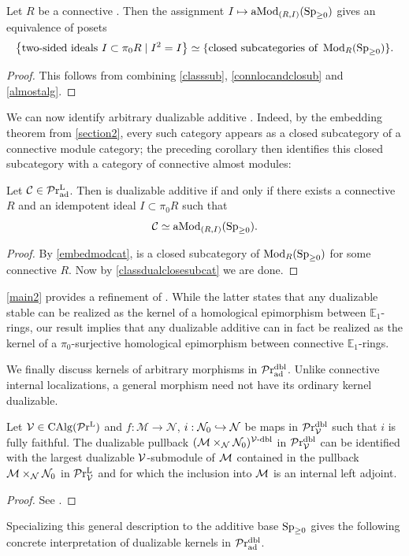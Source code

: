 \documentclass[a4paper,10pt, oneside]{amsart}
\begin{document}
	
	\begin{cor}\label{classdualclosesubcat}
		Let $R$ be a connective \eonering. Then the assignment $I\mapsto \operatorname{aMod}_{(R,I)}(\operatorname{Sp}_{\geq0})$ gives an equivalence of posets
		$$\left\{\text{two-sided ideals } I \subset \pi_0 R \mid I^2=I\right\} \simeq \{\text{closed subcategories of }\operatorname{Mod}_R(\operatorname{Sp}_{\geq0})\} .$$
	\end{cor}
	\begin{proof}

		This follows from combining \cref{classsub}, \cref{connlocandclosub} and \cref{almostalg}.

	\end{proof}
	We can now identify arbitrary dualizable additive \infcats. Indeed, by the embedding theorem from \cref{section2}, every such category appears as a closed subcategory of a connective module category; the preceding corollary then identifies this closed subcategory with a category of connective almost modules:
	
		\begin{thm}\label{main2}
		Let $\mathcal{C}\in \mathcal{P}\mathrm{r}_{\mathrm{ad}}^\mathrm{L}$. Then \mcc is dualizable additive if and only if there exists a connective \eonering $R$ and an idempotent ideal $I\subset \pi_0R$ such that $$\mathcal{C}\simeq \operatorname{aMod}_{(R,I)}(\operatorname{Sp}_{\geq0}).$$
	\end{thm}
	\begin{proof}
		By \cref{embedmodcat}, \mcc is a closed subcategory of  $\operatorname{Mod}_R(\operatorname{Sp}_{\geq0})$ for some connective \eonering $R$. Now by  \cref{classdualclosesubcat} we are done.
	\end{proof}
	
\begin{rem}
	\cref{main2} provides a refinement of \cite[Theorem 2.10.16]{krause2024sheaves}. While the latter states that any dualizable stable \infcat can be realized as the kernel of a homological epimorphism between $\mathbb{E}_1$-rings, our result implies that any dualizable additive \infcat can in fact be realized as the kernel of a $\pi_0$-surjective homological epimorphism between connective $\mathbb{E}_1$-rings.
\end{rem}
We finally discuss kernels of arbitrary morphisms in $\mathcal{P}\mathrm{r}_{\mathrm{ad}}^{\mathrm{dbl}}$. Unlike connective internal localizations, a general morphism need not have its ordinary kernel dualizable.

	\begin{lem}\label{dualker1}
		Let $\mathcal{V}\in\operatorname{CAlg}(\mathcal{P}\mathrm{r}^\mathrm{L})$ and $f: \mathcal{M} \rightarrow \mathcal{N}$, $i:\mathcal{N}_0\hookrightarrow\mathcal{N}$ be maps in $\mathcal{P}\mathrm{r}_{\mathcal{V}}^{\mathrm{dbl}}$ such that $i$ is fully faithful. The dualizable pullback $(\mathcal{M}\times_\mathcal{N}\mathcal{N}_0)^{\mathcal{V}\text{-}\mathrm{dbl}}$ in $\mathcal{P}\mathrm{r}_{\mathcal{V}}^{\mathrm{dbl}}$ can be identified with the largest dualizable $\mathcal{V}$-submodule of $\mathcal{M}$ contained in the pullback $\mathcal{M}\times_\mathcal{N}\mathcal{N}_0$ in $\mathcal{P}\mathrm{r}^\mathrm{L}_{\mathcal{V}}$ and for which the inclusion into $\mathcal{M}$ is an internal left adjoint.
	\end{lem}
		\begin{proof}
		See \cite[Lemma 4.5.3]{Zariski_Bal}.
	\end{proof}
	Specializing this general description to the additive base $\operatorname{Sp}_{\geq0}$ gives the following concrete interpretation of dualizable kernels in $\mathcal{P}\mathrm{r}_{\mathrm{ad}}^{\mathrm{dbl}}$.
	
\end{document}
